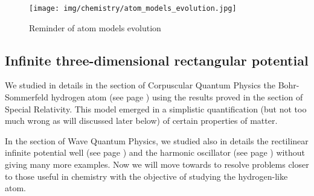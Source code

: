 	\begin{figure}[H]
		\begin{center}
		\texttt{[image: img/chemistry/atom\_models\_evolution.jpg]}
		\end{center}	
		\caption[]{Reminder of atom models evolution}
	\end{figure}
	
	\subsection{Infinite three-dimensional rectangular potential}
	We studied in details in the section of Corpuscular Quantum Physics the Bohr-Sommerfeld hydrogen atom (see page \pageref{relativistic sommerfeld model}) using the results proved in the section of Special Relativity. This model emerged in a simplistic quantification (but not too much wrong as will discussed later below) of certain properties of matter.
	
	In the section of Wave Quantum Physics, we studied also in details the rectilinear infinite potential well (see page \pageref{quantum potential well}) and the harmonic oscillator (see page \pageref{quantum harmonic oscillator}) without giving many more examples. Now we will move towards to resolve problems closer to those useful in chemistry with the objective of studying the hydrogen-like atom.
	
